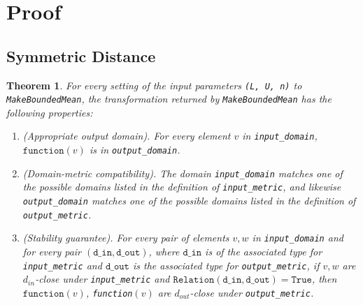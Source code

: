 \documentclass[11pt,a4paper]{article}
\newtheorem{theorem}{Theorem}
\theoremstyle{definition}
\newcommand{\din}{\texttt{d\_in}}
\newcommand{\dout}{\texttt{d\_out}}
\newcommand{\Relation}{\texttt{Relation}}
\newcommand{\True}{\texttt{True}}
\newcommand{\function}{\texttt{function}}
\newcommand{\silvia}[1]{{ {\color{blue}{(silvia)~#1}}}}
\begin{document}
\silvia{Flag: we were told not do deal with floating error issues yet.}

\section{Proof}
\subsection{Symmetric Distance}
\begin{theorem}
    For every setting of the input parameters \texttt{(L, U, n)} to \texttt{MakeBoundedMean}, the transformation returned by \texttt{MakeBoundedMean} has the following properties:
    \begin{enumerate}
        \item \textup{(Appropriate output domain).} For every element $v$ in \texttt{input\_domain}, $\function(v)$ is in \texttt{output\_domain}. %
        \item \textup{(Domain-metric compatibility).} The domain \texttt{input\_domain} matches one of the possible domains listed in the definition of \texttt{input\_metric}, and likewise \texttt{output\_domain} matches one of the possible domains listed in the definition of \texttt{output\_metric}.
        
        \item \textup{(Stability guarantee).} For every pair of elements $v, w$ in \texttt{input\_domain} and for every pair $(\din, \dout)$, where $\din$ is of the associated type for \texttt{input\_metric} and $\dout$ is the associated type for \texttt{output\_metric}, if $v,w$ are $d_{in}$-close under \texttt{input\_metric} and $\Relation(\din, \dout) = \True$, then $\function(v)$, \texttt{function}$(v)$ are $d_{out}$-close under \texttt{output\_metric}.
    \end{enumerate}
\end{theorem}
\end{document}
